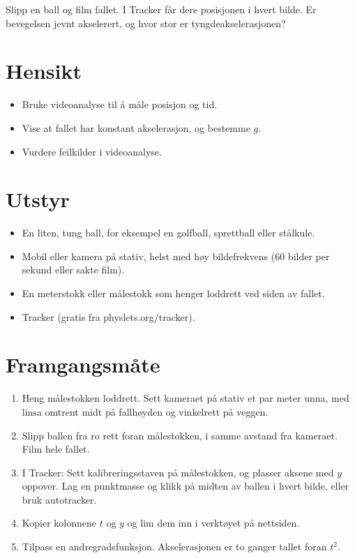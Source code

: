\documentclass[11pt]{article}
\begin{document}

Slipp en ball og film fallet. I Tracker får dere posisjonen i hvert bilde. Er bevegelsen jevnt akselerert, og hvor stor er tyngdeakselerasjonen?

\section*{Hensikt}

\begin{itemize}
\item Bruke videoanalyse til å måle posisjon og tid.
\item Vise at fallet har konstant akselerasjon, og bestemme $g$.
\item Vurdere feilkilder i videoanalyse.
\end{itemize}

\section*{Utstyr}

\begin{itemize}
\item En liten, tung ball, for eksempel en golfball, sprettball eller stålkule.
\item Mobil eller kamera på stativ, helst med høy bildefrekvens (60 bilder per sekund eller sakte film).
\item En meterstokk eller målestokk som henger loddrett ved siden av fallet.
\item Tracker (gratis fra physlets.org/tracker).
\end{itemize}

\section*{Framgangsmåte}

\begin{enumerate}
\item Heng målestokken loddrett. Sett kameraet på stativ et par meter unna, med linsa omtrent midt på fallhøyden og vinkelrett på veggen.
\item Slipp ballen fra ro rett foran målestokken, i samme avstand fra kameraet. Film hele fallet.
\item I Tracker: Sett kalibreringsstaven på målestokken, og plasser aksene med $y$ oppover. Lag en punktmasse og klikk på midten av ballen i hvert bilde, eller bruk autotracker.
\item Kopier kolonnene $t$ og $y$ og lim dem inn i verktøyet på nettsiden.
\item Tilpass en andregradsfunksjon. Akselerasjonen er to ganger tallet foran $t^{2}$.
\end{enumerate}
\end{document}
